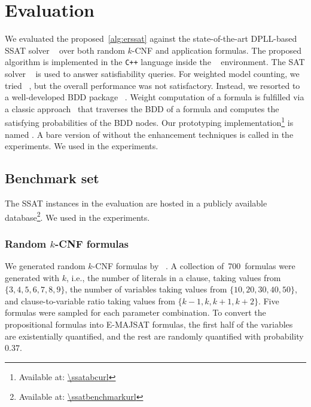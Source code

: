 \renewcommand{\nrandom}{\num{700}}
\renewcommand{\napplication}{\num{212}}
\newcommand{\ntoilet}{\num{77}}
\newcommand{\nmaxcount}{\num{26}}
\newcommand{\nsandcastle}{\num{25}}
\newcommand{\nconformant}{\num{24}}
\newcommand{\nmpec}{\num{60}}

\section{Evaluation}
\label{sect:erssat-evaluation}

We evaluated the proposed~\cref{alg:erssat} against
the state-of-the-art DPLL-based SSAT solver \dcssat~\cite{Majercik2005}
over both random $k$-CNF and application formulas.
The proposed algorithm is implemented in the \texttt{C++} language inside the \abc~\cite{ABC} environment.
The SAT solver ~\cite{Een2003Solver} is used to answer satisfiability queries.
For weighted model counting,
we tried \cachet~\cite{Sang2004,Sang2005ModelCounting},
but the overall performance was not satisfactory.
Instead, we resorted to a well-developed BDD package \cudd~\cite{CUDD}.
Weight computation of a formula is fulfilled via a classic approach~\cite{Darwiche2002KnowledgeCompilation} that traverses the BDD of a formula and computes the satisfying probabilities of the BDD nodes.
Our prototyping implementation\footnote{Available at: \url{\ssatabcurl}} is named \erssat.
A bare version of \erssat without the enhancement techniques is called \erssatb in the experiments.
We used \ssatABCRevision in the experiments.

\subsection{Benchmark set}
The SSAT instances in the evaluation are hosted
in a publicly available database\footnote{Available at: \url{\ssatbenchmarkurl}}.
We used \ssatBenchRevision in the experiments.

\subsubsection{Random $k$-CNF formulas}
We generated random $k$-CNF formulas by \cnfgen~\cite{Lauria2017CNFgen}.
A collection of~\nrandom~formulas were generated with $k$,
i.e., the number of literals in a clause,
taking values from $\{3,4,5,6,7,8,9\}$,
the number of variables taking values from $\{10,20,30,40,50\}$,
and clause-to-variable ratio taking values from $\{k-1,k,k+1,k+2\}$.
Five formulas were sampled for each parameter combination.
To convert the propositional formulas into E-MAJSAT formulas,
the first half of the variables are existentially quantified,
and the rest are randomly quantified with probability $0.37$.

